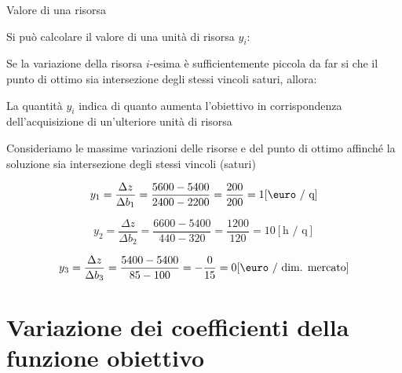 \documentclass{beamer}
\begin{document}
\begin{frame}[allowframebreaks]{Valore di una risorsa}

Si può calcolare il valore di una unità di risorsa $y_i$:


\framebreak

\small{
Se la variazione della risorsa $i$-esima è sufficientemente piccola
da far si che il punto di ottimo sia intersezione degli stessi
vincoli saturi, allora:}


\small{
La quantità $y_i$ indica di quanto aumenta l'obiettivo in corrispondenza
dell’acquisizione di un'ulteriore unità di risorsa}

\framebreak

\footnotesize{
Consideriamo le massime variazioni delle risorse e del punto
di ottimo affinché la soluzione sia intersezione degli stessi
vincoli (saturi)

\[
y_1=\frac{\Delta z}{\Delta b_1}
   =\frac{5600-5400}{2400-2200}
   =\frac{200}{200}
   =1 [\text{\euro / q}]
\]

\[
y_2=\frac{\Delta z}{\Delta b_2}
   =\frac{6600-5400}{440-320}
   =\frac{1200}{120}
   =10 [\text{h / q}]
\]

\[
y_3=\frac{\Delta z}{\Delta b_3}
   =\frac{5400-5400}{85-100}
   =-\frac{0}{15}
   =0 [\text{\euro / dim. mercato}]
\]}
\end{frame}

\section{Variazione dei coefficienti della funzione obiettivo}
\end{document}

